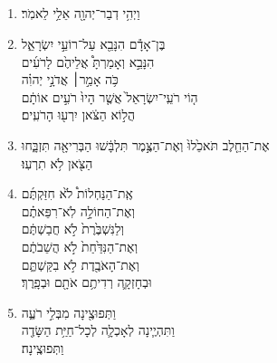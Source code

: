\documentclass[12pt,a4paper,titlepage]{article}
\def \verseSpace{\vskip 0.45em}
\def \pscolor{red} %
\def \pslabelsep{0.2em} %
\def \psleftmargin{0em} %
\begin{document}
\begin{hebrew}

      \newpage

      \section*{}
      \subsection*{}
      \vspace{-0.6mm}
      \begin{enumerate}[leftmargin=\psleftmargin, labelsep=\pslabelsep, label=\fontspec{Linux Libertine}\arabic*, font=\color{\pscolor}\small\textsuperscript, parsep=0em, itemsep=0em, topsep=0em]
            \item וַיְהִ֥י דְבַר־יְהוָ֖ה אֵלַ֥י לֵאמֹֽר׃
            \item  בֶּן־אָדָ֕ם הִנָּבֵ֖א עַל־רוֹעֵ֣י יִשְׂרָאֵ֑ל \\ הִנָּבֵ֣א וְאָמַרְתָּ֩ אֲלֵיהֶ֙ם לָרֹעִ֜ים \\ כֹּ֥ה אָמַ֣ר׀ אֲדֹנָ֣י יְהוִ֗ה \\ ה֤וֹי רֹעֵֽי־יִשְׂרָאֵל֙ אֲשֶׁ֤ר הָיוּ֙ רֹעִ֣ים אוֹתָ֔ם \\ הֲל֣וֹא הַצֹּ֔אן יִרְע֖וּ הָרֹעִֽים׃
            \item אֶת־הַחֵ֤לֶב תֹּאכֵ֙לוּ֙ וְאֶת־הַצֶּ֣מֶר תִּלְבָּ֔שׁוּ הַבְּרִיאָ֖ה תִּזְבָּ֑חוּ \\ הַצֹּ֖אן לֹ֥א תִרְעֽוּ׃
            \item אֶֽת־הַנַּחְלוֹת֩ לֹ֙א חִזַּקְתֶּ֜ם \\ וְאֶת־הַחוֹלָ֣ה לֹֽא־רִפֵּאתֶ֗ם \\ וְלַנִּשְׁבֶּ֙רֶת֙ לֹ֣א חֲבַשְׁתֶּ֔ם \\ וְאֶת־הַנִּדַּ֙חַת֙ לֹ֣א הֲשֵׁבֹתֶ֔ם \\ וְאֶת־הָאֹבֶ֖דֶת לֹ֣א בִקַּשְׁתֶּ֑ם \\ וּבְחָזְקָ֛ה רְדִיתֶ֥ם אֹתָ֖ם וּבְפָֽרֶךְ׃
            \item וַתְּפוּצֶ֖ינָה מִבְּלִ֣י רֹעֶ֑ה \\ וַתִּהְיֶ֧ינָה לְאָכְלָ֛ה לְכָל־חַיַּ֥ת הַשָּׂדֶ֖ה \\ וַתְּפוּצֶֽינָה׃

\end{enumerate}
\end{hebrew}
\end{document}
